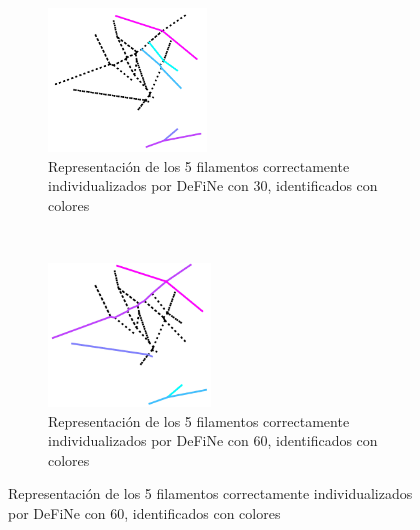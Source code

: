 \begin{figure}[h!]
    \centering
    \begin{subfigure}[t]{0.49\textwidth}
        \centering
        \includegraphics[height=1.5in]{resultImages/field3-t0-2cellBcrop-filtered-DeFiNeExactMatch-30.png}
        \caption{Representaci\'on de los 5 filamentos correctamente individualizados por DeFiNe con 30\textdegree, identificados con colores}
        \label{fig:field3t0filtered1Results-define30Exact}
    \end{subfigure}
    ~ 
    \begin{subfigure}[t]{0.49\textwidth}
        \centering
        \includegraphics[height=1.5in]{resultImages/field3-t0-2cellBcrop-filtered-DeFiNeExactMatch-60.png}
        \caption{Representaci\'on de los 5 filamentos correctamente individualizados por DeFiNe con 60\textdegree, identificados con colores}
        \label{fig:field3t0filtered1Results-define60Exact}
    \end{subfigure}
    

\end{figure}
